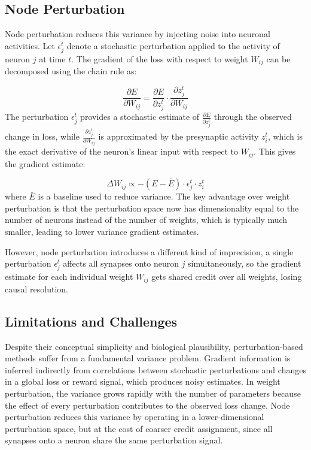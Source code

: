 \subsection{Node Perturbation}

Node perturbation reduces this variance by injecting noise into neuronal
activities. Let $\epsilon_j^t$ denote
a stochastic perturbation applied to the activity of neuron $j$ at time $t$.
The gradient of the loss with respect to weight $W_{ij}$ can be decomposed
using the chain rule as:

\begin{equation}
\frac{\partial E}{\partial W_{ij}} = \frac{\partial E}{\partial z_j^t} \cdot
\frac{\partial z_j^t}{\partial W_{ij}}
\end{equation}
The perturbation $\epsilon_j^t$ provides a stochastic estimate of
$\frac{\partial E}{\partial z_j^t}$ through the observed change in loss,
while $\frac{\partial z_j^t}{\partial W_{ij}}$ is approximated by the
presynaptic activity $z_i^t$, which is the exact derivative of the neuron's
linear input with respect to $W_{ij}$. This gives the gradient estimate:

\begin{equation}
\Delta W_{ij} \propto -(E - \bar{E}) \cdot \epsilon_j^t \cdot z_i^t
\end{equation}
where $\bar{E}$ is a baseline used to reduce variance. The key advantage
over weight perturbation is that the perturbation space now has
dimensionality equal to the number of neurons instead of the number of
weights, which is typically much smaller, leading to lower variance gradient
estimates.

However, node perturbation introduces a different kind of imprecision, a
single perturbation $\epsilon_j^t$ affects all synapses onto neuron $j$
simultaneously, so the gradient estimate for each individual weight $W_{ij}$
gets shared credit over all weights, losing causal resolution.

\subsection{Limitations and Challenges}

Despite their conceptual simplicity and biological plausibility,
perturbation-based methods suffer from a fundamental variance problem.
Gradient information is inferred indirectly from correlations between
stochastic perturbations and changes in a global loss or reward signal,
which produces noisy estimates. In weight perturbation, the variance grows
rapidly with the number of parameters because the effect of every
perturbation contributes to the observed loss change. Node perturbation
reduces this variance by operating in a lower-dimensional perturbation
space, but at the cost of coarser credit assignment, since all synapses
onto a neuron share the same perturbation signal.


